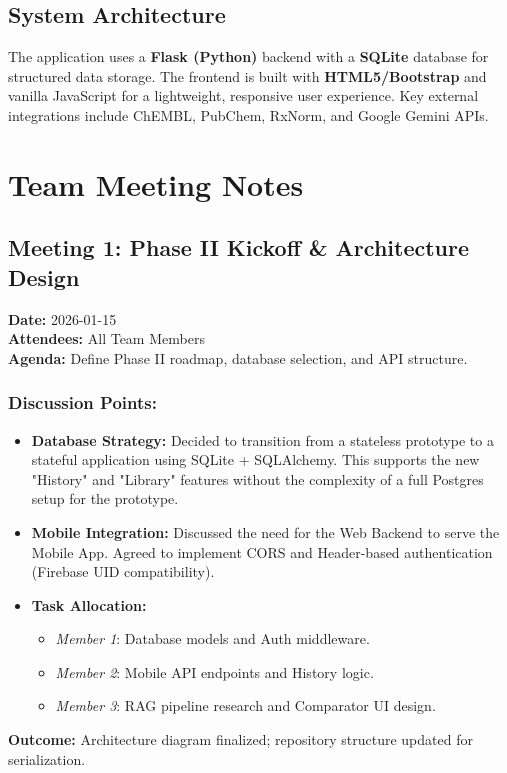 \documentclass[a4paper,12pt]{article}
\begin{document}
\subsection{System Architecture}
The application uses a \textbf{Flask (Python)} backend with a \textbf{SQLite} database for structured data storage. The frontend is built with \textbf{HTML5/Bootstrap} and vanilla JavaScript for a lightweight, responsive user experience. Key external integrations include ChEMBL, PubChem, RxNorm, and Google Gemini APIs.

\newpage

\section{Team Meeting Notes}

\subsection*{Meeting 1: Phase II Kickoff \& Architecture Design}
\textbf{Date:} 2026-01-15 \\
\textbf{Attendees:} All Team Members \\
\textbf{Agenda:} Define Phase II roadmap, database selection, and API structure.

\subsubsection*{Discussion Points:}
\begin{itemize}
    \item \textbf{Database Strategy:} Decided to transition from a stateless prototype to a stateful application using SQLite + SQLAlchemy. This supports the new "History" and "Library" features without the complexity of a full Postgres setup for the prototype.
    \item \textbf{Mobile Integration:} Discussed the need for the Web Backend to serve the Mobile App. Agreed to implement CORS and Header-based authentication (Firebase UID compatibility).
    \item \textbf{Task Allocation:}
    \begin{itemize}
        \item \textit{Member 1}: Database models and Auth middleware.
        \item \textit{Member 2}: Mobile API endpoints and History logic.
        \item \textit{Member 3}: RAG pipeline research and Comparator UI design.
    \end{itemize}
\end{itemize}
\textbf{Outcome:} Architecture diagram finalized; repository structure updated for serialization.
\end{document}
